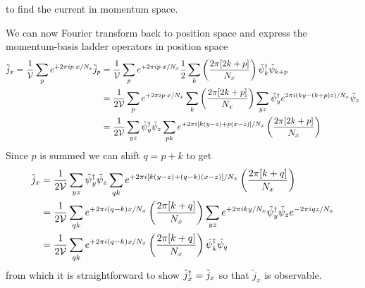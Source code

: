 to find the current in momentum space.

We can now Fourier transform back to position space and express the momentum-basis ladder operators in position space
\begin{align}
	\tilde{j}_x
	=
	\frac{1}{\mathcal{V}} \sum_p e^{+2\pi i p \cdot x / N_x} \tilde{j}_p 
	&=
	\frac{1}{\mathcal{V}} \sum_p e^{+2\pi i p \cdot x / N_x} 
	\frac{1}{2} \sum_k \left(\frac{2\pi [ 2k+p ]}{N_x}\right) \tilde{\psi}{}^{\dagger}_{k} \tilde{\psi}_{k+p}
	\nonumber\\
	&=
	\frac{1}{2\mathcal{V}} \sum_p e^{+2\pi i p \cdot x / N_x} 
	\sum_k \left(\frac{2\pi [ 2k+p ]}{N_x}\right) \sum_{yz} \tilde{\psi}{}^{\dagger}_{y} e^{2\pi i (ky - (k+p)z) / N_x} \tilde{\psi}_{z}
	\nonumber\\
	&=
	\frac{1}{2\mathcal{V}}
	\sum_{yz} \tilde{\psi}{}^{\dagger}_{y}  \tilde{\psi}_{z}
	\sum_{pk} e^{+2\pi i [ k (y-z) + p  (x-z) ]  / N_x} \left(\frac{2\pi [ 2k+p ]}{N_x}\right)
\end{align}
Since $p$ is summed we can shift $q=p+k$ to get
\begin{align}
	\tilde{j}_x
	&=
	\frac{1}{2\mathcal{V}}
	\sum_{yz} \tilde{\psi}{}^{\dagger}_{y}  \tilde{\psi}_{z}
	\sum_{qk} e^{+2\pi i [ k (y-z) + (q-k)  (x-z) ]  / N_x} \left(\frac{2\pi [ k+q ]}{N_x}\right)
	\nonumber\\
	&=
	\frac{1}{2\mathcal{V}}
	\sum_{qk} e^{+2\pi i (q-k) x / N_x} \left(\frac{2\pi [ k+q ]}{N_x}\right)
	\sum_{yz} e^{+2\pi i ky / N_x} \tilde{\psi}{}^{\dagger}_{y} \tilde{\psi}_{z} e^{-2\pi i q z / N_x}
	\label{eq:current contractible}\\
	&=
	\frac{1}{2\mathcal{V}}
	\sum_{qk} e^{+2\pi i (q-k) x / N_x} \left(\frac{2\pi [ k+q ]}{N_x}\right)
	\tilde{\psi}{}^{\dagger}_{k} \tilde{\psi}_{q}
	\label{eq:current hermitian}
\end{align}
from which it is straightforward to show $\tilde{j}{}^{\dagger}_x = \tilde{j}_x$ so that $\tilde{j}_x$ is observable.

